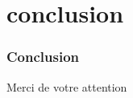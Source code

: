 \section{conclusion}

\begin{frame}
  \frametitle{Conclusion}
\end{frame}

\begin{frame}
  \begin{center}
    \LARGE Merci de votre attention
  \end{center}
\end{frame}

